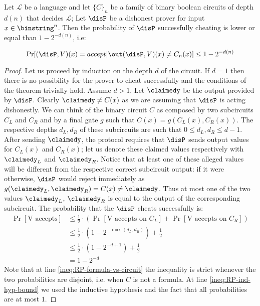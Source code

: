 \begin{mylemma}
\label{lemma:bound-adv-dis}
Let $\mathcal{L}$ be a language and let $\{C\}_n$ be a family of binary boolean 
circuits of  depth $d(n)$ that decides $\mathcal{L}$;
Let $\disP$ be a dishonest prover for input $x \in \binstring^n$.
Then the probability of $\disP$ successfully cheating is lower or equal than $1-2^{-d(n)}$, i.e:

$$\Pr[(\disP, V)(x) = accept | \out(\disP,V)(x) \neq C_n(x)] \leq 1-2^{-d(n)}$$
\end{mylemma}
\begin{proof}
Let us proceed by induction on the depth $d$ of the circuit.
If $d = 1$ then there is no possibility for the prover to cheat successfully 
and the conditions of the theorem trivially hold.
Assume $d > 1$. 
Let $\claimedy$ be the output provided by $\disP$.
Clearly $\claimedy \neq C(x)$ as we are assuming that $\disP$ is acting 
dishonestly. We can think of the binary circuit $C$ as composed by two 
subcircuits $C_L$ and $C_R$ and by a final gate $g$ such that
$  C(x) = g(C_L(x), C_R(x))$. The respective depths $d_L, d_R$ of these 
subcircuits are such that $0 \leq d_L, d_R \leq d-1$. After sending 
$\claimedy$, 
the protocol requires that
$\disP$ sends output values for $C_L(x)$ and
$C_R(x)$; let us denote these claimed values respectively with $\claimedy_L$ 
and  $\claimedy_R$. 
Notice that at least one of these alleged values will be different from the 
respective correct subcircuit output: if it were otherwise, $\disP$ would 
reject immediately as $g(\claimedy_L, \claimedy_R) = C(x) \neq \claimedy$.
Thus at most one of the two values $\claimedy_L$, $\claimedy_R$ is equal 
to the output of the corresponding subcircuit.
The probability that the $\disP$ cheats successfully is:
\begin{align}
\Pr[\mbox{V accepts}] & \leq 
\frac{1}{2}\cdot(\Pr[\mbox{V accepts on } C_L] + \Pr[\mbox{V accepts on } C_R]) 
\label{ineq:RP-formula-vs-circuit}
\\
& \leq \frac{1}{2}\cdot(1-2^{-\max(d_L, d_R)}) + \frac{1}{2} 
\label{ineq:RP-ind-hyp-bound} \\
& \leq \frac{1}{2}\cdot(1-2^{-d+1}) + \frac{1}{2} \\
& = 1 - 2^{-d}
\end{align}
Note that at line \ref{ineq:RP-formula-vs-circuit} the inequality is strict 
whenever 
the two probabilities are disjoint, i.e. when $C$ is not a formula.
At line \ref{ineq:RP-ind-hyp-bound} we used the inductive hypothesis and the 
fact 
that all probabilities are at most $1$.
   
\end{proof}



